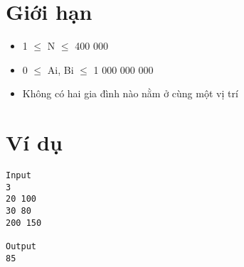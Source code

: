 \section{   Giới hạn  }
\begin{itemize}
	\item     1  $\le$  N  $\le$  400 000   
	\item     0  $\le$  Ai, Bi  $\le$  1 000 000 000   
	\item     Không có hai gia đình nào nằm ở cùng một vị trí   
\end{itemize}

\section{   Ví dụ  }
\begin{verbatim}
Input
3 
20 100 
30 80
200 150

Output
85
\end{verbatim}
